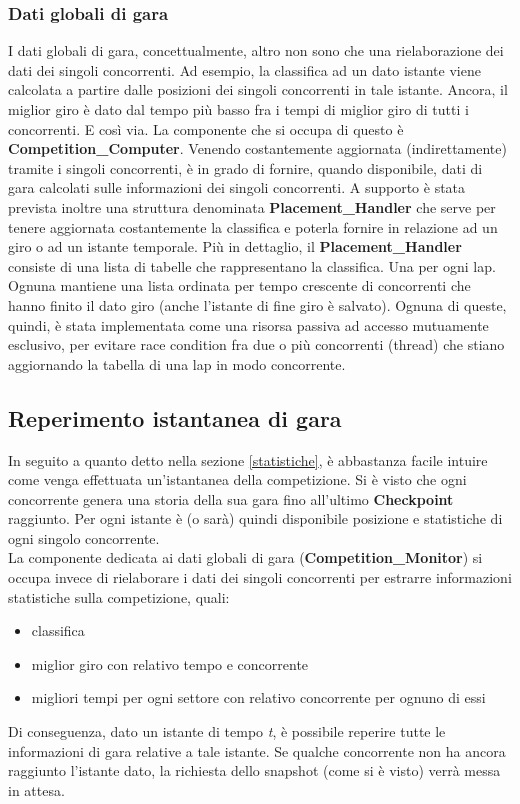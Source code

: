      \subsubsection{Dati globali di gara}
     \label{dati_globali}
     I dati globali di gara, concettualmente, altro non sono che una rielaborazione dei dati dei singoli concorrenti. Ad esempio, la classifica
     ad un dato istante viene calcolata a partire dalle posizioni dei singoli concorrenti in tale istante. Ancora, il miglior giro è dato dal
     tempo più basso fra i tempi di miglior giro di tutti i concorrenti. E così via. La componente che si occupa di questo è \textbf{Competition\_Computer}.
     Venendo costantemente aggiornata (indirettamente) tramite i singoli concorrenti, è in grado di fornire, quando disponibile, dati di gara
     calcolati sulle informazioni dei singoli concorrenti. A supporto è stata prevista inoltre una struttura denominata \textbf{Placement\_Handler}
     che serve per tenere aggiornata costantemente la classifica e poterla fornire in relazione ad un giro o ad un istante temporale.
     Più in dettaglio, il \textbf{Placement\_Handler} consiste di una lista di tabelle che rappresentano la classifica. Una per ogni lap.
     Ognuna mantiene una lista ordinata per tempo crescente di concorrenti che hanno finito il dato giro (anche l'istante di fine giro è
     salvato).
     Ognuna di queste, quindi, è stata implementata come una risorsa passiva ad accesso mutuamente esclusivo, 
     per evitare race condition fra due o più concorrenti (thread) che stiano aggiornando la tabella di una lap in modo concorrente.
\subsection{Reperimento istantanea di gara}
    In seguito a quanto detto nella sezione \ref{statistiche}, è abbastanza facile intuire come venga effettuata un'istantanea della competizione.
    Si è visto che ogni concorrente genera una storia della sua gara fino all'ultimo \textbf{Checkpoint} raggiunto. Per ogni istante è (o sarà)
    quindi disponibile posizione e statistiche di ogni singolo concorrente.\\
    La componente dedicata ai dati globali di gara (\textbf{Competition\_Monitor}) si occupa invece di rielaborare i dati dei singoli concorrenti
    per estrarre informazioni statistiche sulla competizione, quali:
    \begin{itemize}
    \item classifica
    \item miglior giro con relativo tempo e concorrente
    \item migliori tempi per ogni settore con relativo concorrente per ognuno di essi
    \end{itemize}
    Di conseguenza, dato un istante di tempo \emph{t}, è possibile reperire tutte le informazioni di gara relative a tale istante. Se qualche 
    concorrente non ha ancora raggiunto l'istante dato, la richiesta dello snapshot (come si è visto) verrà messa in attesa.
